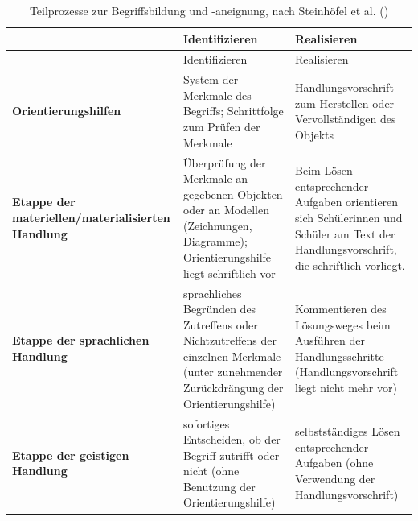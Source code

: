 \documentclass[
]{scrbook}
\theoremstyle{definition}
\theoremstyle{definition}
\theoremstyle{definition}
\theoremstyle{definition}
\theoremstyle{remark}
\begin{document}
\begin{longtable}[]{@{}
  >{\raggedright\arraybackslash}p{}
  >{\raggedright\arraybackslash}p{}
  >{\raggedright\arraybackslash}p{}@{}}
\caption{\label{tab:begriffsschritte} Teilprozesse zur Begriffsbildung und -aneignung, nach Steinhöfel et al. ()}\tabularnewline
\toprule\noalign{}
\begin{minipage}[b]{\linewidth}\raggedright
\end{minipage} & \begin{minipage}[b]{\linewidth}\raggedright
Identifizieren
\end{minipage} & \begin{minipage}[b]{\linewidth}\raggedright
Realisieren
\end{minipage} \\
\midrule\noalign{}
\endfirsthead
\toprule\noalign{}
\begin{minipage}[b]{\linewidth}\raggedright
\end{minipage} & \begin{minipage}[b]{\linewidth}\raggedright
Identifizieren
\end{minipage} & \begin{minipage}[b]{\linewidth}\raggedright
Realisieren
\end{minipage} \\
\midrule\noalign{}
\endhead
\bottomrule\noalign{}
\endlastfoot
\textbf{Orientierungshilfen} & System der Merkmale des Begriffs; Schrittfolge zum Prüfen der Merkmale & Handlungsvorschrift zum Herstellen oder Vervollständigen des Objekts \\
\textbf{Etappe der materiellen/materialisierten Handlung} & Überprüfung der Merkmale an gegebenen Objekten oder an Modellen (Zeichnungen, Diagramme); Orientierungshilfe liegt schriftlich vor & Beim Lösen entsprechender Aufgaben orientieren sich Schülerinnen und Schüler am Text der Handlungsvorschrift, die schriftlich vorliegt. \\
\textbf{Etappe der sprachlichen Handlung} & sprachliches Begründen des Zutreffens oder Nichtzutreffens der einzelnen Merkmale (unter zunehmender Zurückdrängung der Orientierungshilfe) & Kommentieren des Lösungsweges beim Ausführen der Handlungsschritte (Handlungsvorschrift liegt nicht mehr vor) \\
\textbf{Etappe der geistigen Handlung} & sofortiges Entscheiden, ob der Begriff zutrifft oder nicht (ohne Benutzung der Orientierungshilfe) & selbstständiges Lösen entsprechender Aufgaben (ohne Verwendung der Handlungsvorschrift) \\
\end{longtable}
\end{document}
